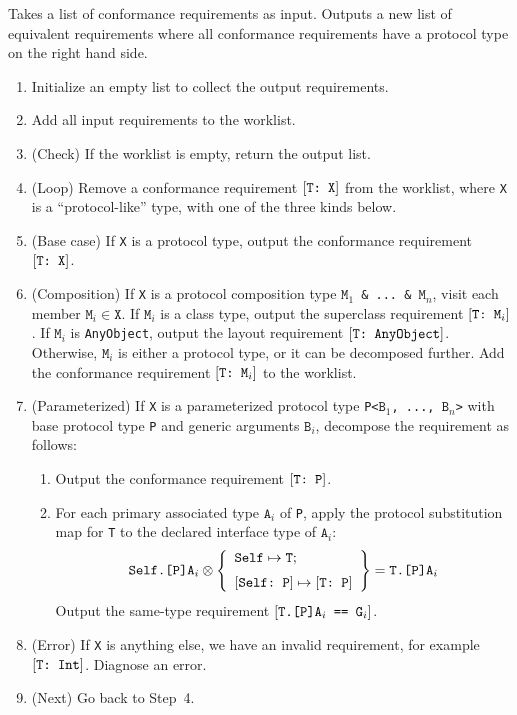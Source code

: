 \documentclass[../generics]{subfiles}
\begin{document}
\begin{algorithm}\label{expand conformance req algorithm} Takes a list of conformance requirements as input. Outputs a new list of equivalent requirements where all conformance requirements have a protocol type on the right hand side.
\begin{enumerate}
\item Initialize an empty list to collect the output requirements.
\item Add all input requirements to the worklist.
\item (Check) If the worklist is empty, return the output list.
\item (Loop) Remove a conformance requirement $[\texttt{T:~X}]$ from the worklist, where \texttt{X} is a ``protocol-like'' type, with one of the three kinds below.
\item (Base case) If \texttt{X} is a protocol type, output the conformance requirement $[\texttt{T:~X}]$.
\item (Composition) If \texttt{X} is a protocol composition type \texttt{$\texttt{M}_1$ \& ...~\& $\texttt{M}_n$}, visit each member $\texttt{M}_i\in\texttt{X}$. If $\texttt{M}_i$ is a class type, output the superclass requirement $[\texttt{T:~$\texttt{M}_i$}]$. If $\texttt{M}_i$ is \texttt{AnyObject}, output the layout requirement $[\texttt{T:~AnyObject}]$. Otherwise, $\texttt{M}_i$ is either a protocol type, or it can be decomposed further. Add the conformance requirement $[\texttt{T:~$\texttt{M}_i$}]$ to the worklist.
\item (Parameterized) If \texttt{X} is a parameterized protocol type \texttt{P<$\texttt{B}_1$, ..., $\texttt{B}_n$>} with base protocol type \texttt{P} and generic arguments $\texttt{B}_i$, decompose the requirement as follows:
\begin{enumerate}
\item Output the conformance requirement $[\texttt{T:~P}]$.
\item For each primary associated type $\texttt{A}_i$ of \texttt{P}, apply the protocol substitution map for \texttt{T} to the declared interface type of $\texttt{A}_i$:
\[\texttt{Self.[P]A}_i \otimes \SubstMapLongC{\SubstType{Self}{T}}{\SubstConf{Self}{T}{P}} = \texttt{T.[P]A}_i\]
Output the same-type requirement $[\texttt{$\texttt{T.[P]A}_i$ == $\texttt{G}_i$}]$.
\end{enumerate}
\item (Error) If \texttt{X} is anything else, we have an invalid requirement, for example $[\texttt{T:~Int}]$. Diagnose an error.
\item (Next) Go back to Step~4.
\end{enumerate}
\end{algorithm}
\end{document}

